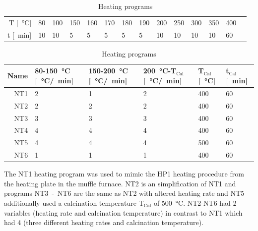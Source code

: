 \documentclass[a4paper]{article}
\newcommand{\minutes}[1]{\SI{#1}{\minute}}
\newcommand{\oc}[1]{\SI{#1}{\degreeCelsius}}
\begin{document}
\begin{table}[h]
	\centering
    \caption{Heating programs}
	\label{tab:labtech}
	\begin{tabular}{rl ll ll ll ll ll ll }%
		\hline
		\hline
		T [\oc{}]	    &80		&100	&150	&160	&170 	&180	&190	&200	&250	&300	&350	&400	\\
		t [\minutes{}]	&10 	&10		&5 		&5 		&5 		&5 &5 &10 &10 &10 &10 &60 \\
		\hline
		\hline
	\end{tabular}
	\label{tab:nt}
	\begin{tabular}{rl ll ll}%
		\hline\hline
		Name	&80-150\oc{} [\oc{}/\minutes{}]	&150-200\oc{} [\oc{}/\minutes{}]	&200\oc{}-T$_{\textrm{Cal}}$ [\oc{}/\minutes{}]	&T$_{\textrm{Cal}}$ [\oc{}] &t$_{\textrm{Cal}}$ [\minutes{}]	\\
		\hline
		NT1		&2					&1					&2				&400	&60  \\
		NT2		&2					&2					&2				&400	&60  \\
		NT3		&3					&3					&3				&400	&60  \\
		NT4		&4					&4					&4				&400	&60  \\
		NT5		&4					&4					&4				&500	&60  \\
		NT6		&1					&1					&1				&400	&60  \\
		\hline\hline
	\end{tabular}
\end{table}
%
The NT1 heating program was used to mimic the HP1 heating procedure from the heating 
plate in the muffle furnace. 
NT2 is an simplification of NT1 and programs NT3~-~NT6 are the same as NT2 with altered 
heating rate and 
NT5 additionally used a calcination temperature T$_{\textrm{Cal}}$ of \SI{500}{\celsius}.
NT2-NT6 had 2 variables (heating rate and calcination temperature) in contrast to 
NT1 which had 4 (three different heating rates and calcination temperature). 
\end{document}
